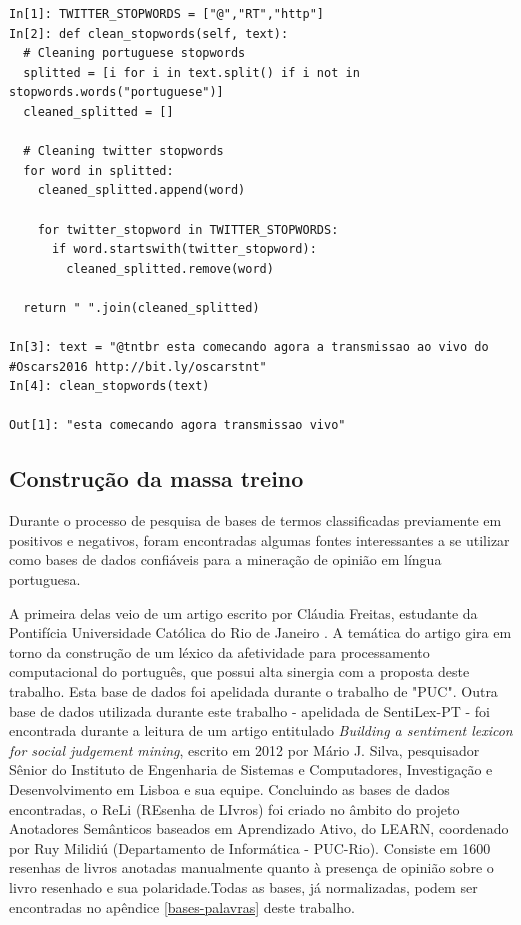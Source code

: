 \begin{lstlisting}[style=python, frame=single]
In[1]: TWITTER_STOPWORDS = ["@","RT","http"]
In[2]: def clean_stopwords(self, text):
  # Cleaning portuguese stopwords
  splitted = [i for i in text.split() if i not in stopwords.words("portuguese")]
  cleaned_splitted = []

  # Cleaning twitter stopwords
  for word in splitted:
    cleaned_splitted.append(word)

    for twitter_stopword in TWITTER_STOPWORDS:
      if word.startswith(twitter_stopword):
        cleaned_splitted.remove(word)

  return " ".join(cleaned_splitted)

In[3]: text = "@tntbr esta comecando agora a transmissao ao vivo do #Oscars2016 http://bit.ly/oscarstnt"
In[4]: clean_stopwords(text)

Out[1]: "esta comecando agora transmissao vivo"

\end{lstlisting}



\subsection{Construção da massa treino}
Durante o processo de pesquisa de bases de termos classificadas previamente em positivos e negativos, foram encontradas algumas fontes interessantes a se utilizar como bases de dados confiáveis para a mineração de opinião em língua portuguesa.

A primeira delas veio de um artigo escrito por Cláudia Freitas, estudante da Pontifícia Universidade Católica do Rio de Janeiro \cite{freitas2013construccao}. A temática do artigo gira em torno da construção de um léxico da afetividade para processamento computacional do português, que possui alta sinergia com a proposta deste trabalho. Esta base de dados foi apelidada durante o trabalho de "PUC".
Outra base de dados utilizada durante este trabalho - apelidada de SentiLex-PT - foi encontrada durante a leitura de um artigo entitulado \textit{Building a sentiment lexicon for social judgement mining}\cite{marioj.silvapaulacarvalholuissarmento2012}, escrito em 2012 por Mário J. Silva, pesquisador Sênior do Instituto de Engenharia de Sistemas e Computadores, Investigação e Desenvolvimento em Lisboa e sua equipe. 
Concluindo as bases de dados encontradas, o ReLi (REsenha de LIvros) foi criado no âmbito do projeto Anotadores Semânticos baseados em Aprendizado Ativo, do LEARN, coordenado por Ruy Milidiú (Departamento de Informática - PUC-Rio). Consiste em 1600 resenhas de livros anotadas manualmente quanto à presença de opinião sobre o livro resenhado e sua polaridade\cite{reli-resenha-livros}.Todas as bases, já normalizadas, podem ser encontradas no apêndice \ref{bases-palavras} deste trabalho. 

